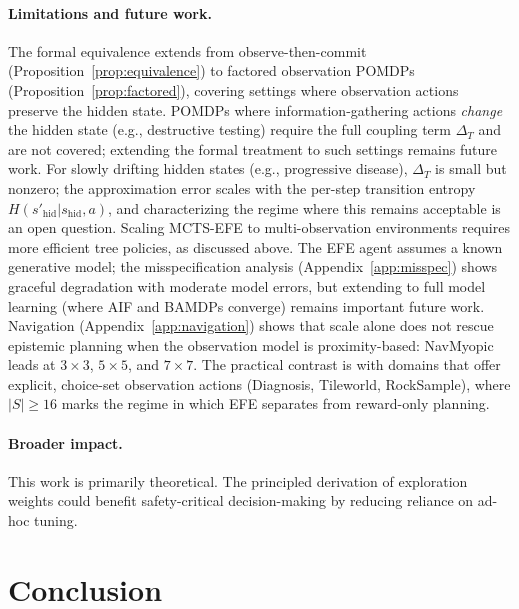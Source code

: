 \documentclass[runningheads]{llncs}
\begin{document}
\paragraph{Limitations and future work.}
The formal equivalence extends from observe-then-commit (Proposition~\ref{prop:equivalence}) to factored observation POMDPs (Proposition~\ref{prop:factored}), covering settings where observation actions preserve the hidden state. POMDPs where information-gathering actions \emph{change} the hidden state (e.g., destructive testing) require the full coupling term $\Delta_T$ and are not covered; extending the formal treatment to such settings remains future work. For slowly drifting hidden states (e.g., progressive disease), $\Delta_T$ is small but nonzero; the approximation error scales with the per-step transition entropy $H(s'_{\mathrm{hid}} | s_{\mathrm{hid}}, a)$, and characterizing the regime where this remains acceptable is an open question. Scaling MCTS-EFE to multi-observation environments requires more efficient tree policies, as discussed above. The EFE agent assumes a known generative model; the misspecification analysis (Appendix~\ref{app:misspec}) shows graceful degradation with moderate model errors, but extending to full model learning (where AIF and BAMDPs converge) remains important future work. Navigation (Appendix~\ref{app:navigation}) shows that scale alone does not rescue epistemic planning when the observation model is proximity-based: NavMyopic leads at $3{\times}3$, $5{\times}5$, and $7{\times}7$. The practical contrast is with domains that offer explicit, choice-set observation actions (Diagnosis, Tileworld, RockSample), where $|S| \geq 16$ marks the regime in which EFE separates from reward-only planning.

\paragraph{Broader impact.}
This work is primarily theoretical. The principled derivation of exploration weights could benefit safety-critical decision-making by reducing reliance on ad-hoc tuning.

\section{Conclusion}
\end{document}
